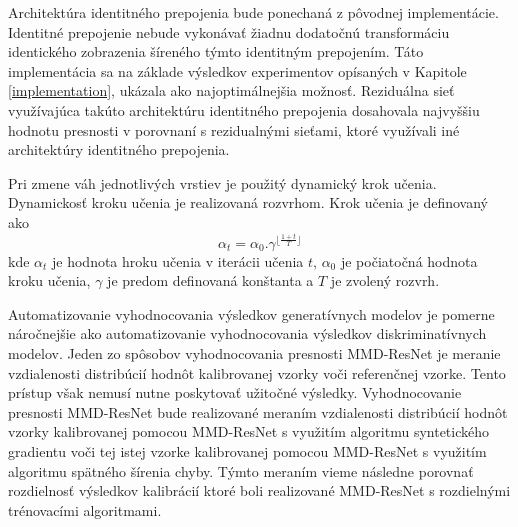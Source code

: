 Architektúra identitného prepojenia bude ponechaná z pôvodnej implementácie.
Identitné prepojenie nebude vykonávať žiadnu dodatočnú transformáciu identického zobrazenia šíreného týmto identitným prepojením. Táto implementácia sa na základe výsledkov experimentov opísaných v Kapitole \ref{implementation}, ukázala ako najoptimálnejšia možnosť. Reziduálna sieť využívajúca takúto architektúru identitného prepojenia dosahovala najvyššiu hodnotu presnosti v porovnaní s rezidualnými sieťami, ktoré využívali iné architektúry identitného prepojenia.


Pri zmene váh jednotlivých vrstiev je použitý dynamický krok učenia. Dynamickosť kroku učenia je realizovaná rozvrhom. Krok učenia je definovaný ako 
\begin{equation}
    \alpha_t = \alpha_0 . \gamma^{\lfloor\frac{1+t}{T}\rfloor}
\end{equation}
kde $\alpha_t$ je hodnota hroku učenia v iterácii učenia $t$, $\alpha_0$ je počiatočná hodnota kroku učenia, $\gamma$ je predom definovaná konštanta a $T$ je zvolený rozvrh.

Automatizovanie vyhodnocovania výsledkov generatívnych modelov je pomerne náročnejšie ako automatizovanie vyhodnocovania výsledkov diskriminatívnych modelov. Jeden zo spôsobov vyhodnocovania presnosti MMD-ResNet je meranie vzdialenosti distribúcií hodnôt kalibrovanej vzorky voči referenčnej vzorke. Tento prístup však nemusí nutne poskytovať užitočné výsledky. Vyhodnocovanie presnosti MMD-ResNet bude realizované meraním vzdialenosti distribúcií hodnôt vzorky kalibrovanej pomocou MMD-ResNet s využitím algoritmu syntetického gradientu voči tej istej vzorke kalibrovanej pomocou MMD-ResNet s využitím algoritmu spätného šírenia chyby. Týmto meraním vieme následne porovnať rozdielnosť výsledkov kalibrácií ktoré boli realizované MMD-ResNet s rozdielnými trénovacími algoritmami.

